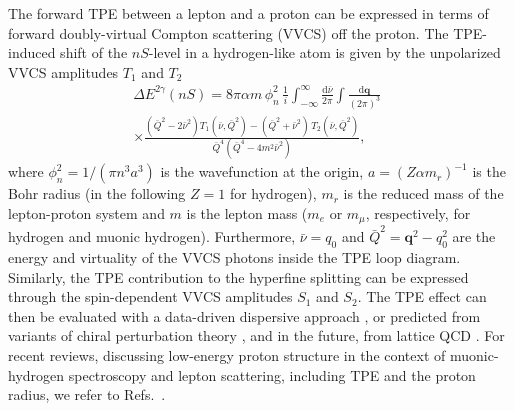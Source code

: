 The forward TPE between a lepton and a proton can be expressed in terms of forward doubly-virtual Compton scattering (VVCS) off the proton. The TPE-induced shift of the $nS$-level in a hydrogen-like atom is given by the unpolarized VVCS amplitudes $T_1$ and $T_2$  \cite{Carlson:2011zd}
\begin{eqnarray}
&&\Delta E^{2\gamma}(nS)= 8\pi \alpha m \,\phi_n^2\,
\frac{1}{i}\int_{-\infty}^\infty \!\frac{\mathrm{d}\bar \nu}{2\pi} \int \!\!\frac{\mathrm{d} \boldsymbol{q}}{(2\pi)^3} \qquad\\
&&\times\frac{\left(\bar Q^2-2\bar \nu^2\right)T_1(\bar \nu,\bar Q^2)-(\bar Q^2+\bar \nu^2)\,T_2(\bar \nu,\bar Q^2)}{\bar Q^4(\bar Q^4-4m^2\bar \nu^2)},\nonumber
\end{eqnarray}
where $\phi_n^2=1/(\pi n^3 a^3)$ is the wavefunction at the origin, $a=(Z \alpha m_r)^{-1}$ is the Bohr radius (in the following $Z=1$ for hydrogen), $m_r$ is the reduced mass of the lepton-proton system and $m$ is the lepton mass ($m_e$ or $m_\mu$, respectively, for hydrogen and muonic hydrogen). Furthermore, $\bar \nu=q_0$ and $\bar Q^2 = \boldsymbol{q}^2 -q_0^2$ are the energy and virtuality of the VVCS photons inside the TPE loop diagram. Similarly, the TPE contribution to the hyperfine splitting can be expressed through the spin-dependent VVCS amplitudes $S_1$ and $S_2$. The TPE effect can then be evaluated with a data-driven dispersive approach \cite{Pachucki:1999zza,Martynenko:2005rc,Carlson:2011zd,Birse:2012eb,Gorchtein:2013yga,Hill:2016bjv,Tomalak:2018uhr,Faustov:2006ve,Carlson:2008ke,Carlson:2011af}, or predicted from variants of chiral perturbation theory \cite{Alarcon:2013cba,Hagelstein:2015lph,Lensky:2017bwi,Hagelstein:2018bdi,Peset:2014yha,Peset:2014jxa,Peset:2016wjq}, and in the future, from lattice QCD \cite{Fu:2022fgh,Hagelstein:2020awq}. For recent reviews, discussing low-energy proton structure in the context of muonic-hydrogen spectroscopy and lepton scattering, including TPE and the proton radius, we refer to Refs.~\cite{Carlson:2007sp,Carlson:2015jba,Gao:2021sml,Peset:2021iul,Antognini:2022xoo,Hagelstein:2015egb}.

